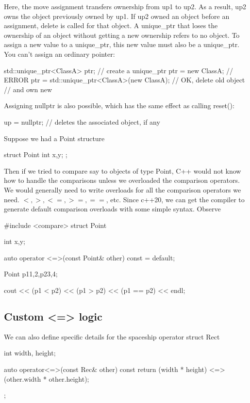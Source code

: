 \documentclass{report}
\begin{document}
\bigbreak \noindent 
Here, the move assignment transfers ownership from up1 to up2. As a result, up2 owns the object previously owned by up1.
\bigbreak \noindent 
If up2 owned an object before an assignment, delete is called for that object. A unique_ptr that loses the ownership of an object without getting a new ownership refers to no object.
\bigbreak \noindent 
To assign a new value to a unique\_ptr, this new value must also be a unique\_ptr. You can’t assign an ordinary pointer:
\bigbreak \noindent 
\begin{cppcode}
    std::unique_ptr<ClassA> ptr; // create a unique_ptr
    ptr = new ClassA; // ERROR
    ptr = std::unique_ptr<ClassA>(new ClassA); // OK, delete old object
    // and own new
\end{cppcode}
\bigbreak \noindent 
Assigning nullptr is also possible, which has the same effect as calling reset():
\bigbreak \noindent 
\begin{cppcode}
up = nullptr; // deletes the associated object, if any
\end{cppcode}



\pagebreak 
{}
\bigbreak \noindent 
Suppose we had a Point structure
\bigbreak \noindent 
\begin{cppcode}
    struct Point {
        int x,y;
    };
\end{cppcode}
\bigbreak \noindent 
Then if we tried to compare say to objects of type Point, C++ would not know how to handle the comparisons unless we overloaded the comparison operators. We would generally need to write overloads for all the comparison operators we need. $<, >, <=, >=, ==$, etc. 
\bigbreak \noindent 
Since c++20, we can get the compiler to generate default comparison overloads with some simple syntax. Observe
\bigbreak \noindent 
\begin{cppcode}
    #include <compare>
    struct Point {
        int x,y;

        auto operator <=>(const Point& other) const = default;
    }

    Point p1{1,2},p2{3,4};

    cout << (p1 < p2) << 
        (p1 > p2) << 
        (p1 == p2) << endl;
\end{cppcode}
\bigbreak \noindent 
\subsection{Custom <=> logic}
\bigbreak \noindent 
We can also define specific details for the spaceship operator
\bigbreak \noindent 
struct Rect {
    int width, height;

    auto operator<=>(const Rec& other) const {
        return (width * height) <=> (other.width * other.height);
    }
};
\end{document}
